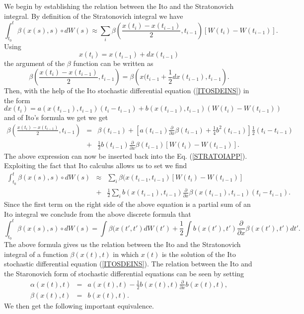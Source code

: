 We begin by establishing the relation between the Ito and the 
Stratonovich integral. By definition of the Stratonovich integral 
we have
\begin{equation}
\label{STRATOIAPP}
\int_{t_0}^t  \beta(x(s),s) \circ dW(s) \approx
 \sum_i \beta \left( \frac{x(t_i) -x(t_{i-1})}{2},t_{i-1} \right)
  [W(t_i) -W(t_{i-1})].
\end{equation}
Using
\begin{equation*}
x(t_i) = x(t_{i-1}) + dx(t_{i-1})
\end{equation*}
the argument of the $\beta$ function can be written as
\begin{equation*}
\beta \left( \frac{x(t_i) -x(t_{i-1})}{2},t_{i-1} \right) =
 \beta \left( x(t_{i-1} + \frac{1}{2} dx(t_{i-1}) ,t_{i-1}\right).
\end{equation*}
Then, with the help of the Ito stochastic differential equation 
(\ref{ITOSDEINS}) in the form
\begin{equation*}
dx(t_i) = a(x(t_{i-1}),t_{i-1}) (t_i -t_{i-1}) + 
   b(x(t_{i-1}),t_{i-1}) (W(t_i) -W(t_{i-1}))
\end{equation*}
and of Ito's formula we get
we get
\begin{eqnarray*}
\beta \left( \frac{x(t_i) -x(t_{i-1})}{2},t_{i-1} \right) & = &
 \beta(t_{i-1}) + \left[ a(t_{i-1}) \frac{\partial}{\partial x} 
 \beta(t_{i-1}) + \frac{1}{4} b^2(t_{i-1})
                  \right] \frac{1}{2}(t_{i} - t_{i-1}) \\
 &  + & \frac{1}{2} b(t_{i-1}) \frac{\partial}{\partial x} 
 \beta(t_{i-1}) [W(t_i) - W(t_{i-1})].
\end{eqnarray*}
The above expression can now be inserted back into the Eq. 
(\ref{STRATOIAPP}). Exploiting the fact that Ito calculus allows us to set 
we find
\begin{eqnarray*}
\int_{t_0}^t  \beta(x(s),s) \circ dW(s) & \approx &
\sum_i \beta(x(t_{i-1},t_{i-1}) [W(t_i) - W(t_{i-1})] \\
 &  + & \frac{1}{2} \sum_i b(x(t_{i-1}),t_{i-1}) 
 \frac{\partial}{\partial x} \beta(x(t_{i-1}),t_{i-1}) (t_i - 
 t_{i-1}).
\end{eqnarray*}
Since the first term on the right side of the above equation is a
partial sum of an Ito integral we conclude from the above discrete
formula that
\begin{equation}
\int_{t_0}^t  \beta(x(s),s) \circ dW(s) = 
\int  \beta(x(t',t') dW(t') 
 + \frac{1}{2} \int b(x(t'),t') 
 \frac{\partial}{\partial x} \beta(x(t'),t') dt'.
\end{equation}
The above formula gives us the relation between the Ito and the 
Stratonovich integral of a function $\beta(x(t),t)$ in which $x(t)$
is the solution of the Ito stochastic differential equation
(\ref{ITOSDEINS}). The relation between the Ito and the 
Staronovich form of stochastic differential equations can be seen 
by setting
\begin{eqnarray*}
\alpha(x(t),t) & = & a(x(t),t) - \frac{1}{2} b(x(t),t) 
\frac{\partial}{\partial x} b(x(t),t), \\
\beta(x(t),t) & = & b(x(t),t).
\end{eqnarray*}
We then get the following important equivalence.

